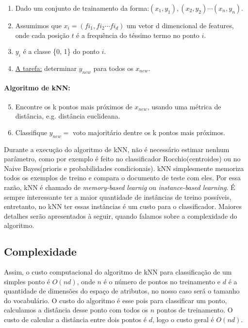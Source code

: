 \documentclass[a4paper, 11 pt, onecolumn]{article}   %
\begin{document}
\begin{enumerate}
  \item Dado um conjunto de trainamento da forma:$(x_1, y_1), (x_2, y_2) \cdots (x_n, y_n)$.
  \item Assumimos que $x_i= (fi_1, fi_2 \cdots fi_d)$ um vetor d dimencional de features, onde cada posição $t$ é a frequência do téssimo termo no ponto $i$.
  \item $y_i$ é a classe \{0, 1\} do ponto $i$.
  \item \underline{A tarefa:} determinar $y_{new}$ para todos os $x_{new}$.
\end{enumerate}
\paragraph{Algoritmo de kNN:}
\begin{enumerate}
\setcounter{enumi}{4}
 \item Encontre os k pontos mais próximos de $x_{new}$, usando uma métrica de distância, e.g. distância euclideana.
  \item Classifique $y_{new} = $ voto majoritário dentre os k pontos mais próximos. 
\end{enumerate}

Durante a execução do algoritmo de kNN, não é necessário estimar nenhum parâmetro, como por exemplo é feito no classificador Rocchio(centroides) ou no Naive Bayes(prioris e probabilidades condicionais). kNN simplesmente memoriza todos os exemplos de treino e compara o documento de teste com eles. Por essa razão, kNN é chamado de \textit{memory-based learnig} ou \textit{instance-based learning}. É sempre interessante ter a maior quantidade de instâncias de treino possíveis, entretanto, no kNN ter essas instâncias é um custo para o classificador. Maiores detalhes serão apresentados à seguir, quando falamos sobre a complexidade do algoritmo.


\subsection{Complexidade}
\label{complexidade}
Assim, o custo computacional do algoritmo de kNN para classificação de um simples ponto é $O(nd)$, onde $n$ é o número de pontos no treinamento e $d$ é a quantidade de dimensões do espaço de atributos, no nosso caso será o tamanho do vocabulário. O custo do algoritmo é esse pois para classificar um ponto, calculamos a distância desse ponto com todos os $n$ pontos de treinamento. O custo de calcular a distância entre dois pontos é $d$, logo o custo geral é $O(nd)$.
\end{document}
